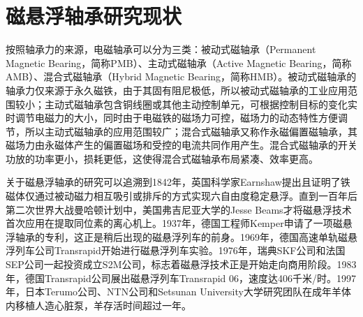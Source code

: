 \documentclass[
  lang=cn,
  degree=master,
  openany,oneside
]{nuaathesis}
\begin{document}
\section{磁悬浮轴承研究现状}

按照轴承力的来源，电磁轴承可以分为三类：被动式磁轴承（Permanent Magnetic Bearing，简称PMB）、主动式磁轴承（Active Magnetic Bearing，简称AMB）、混合式磁轴承（Hybrid Magnetic Bearing，简称HMB）。被动式磁轴承的轴承力仅来源于永久磁铁，由于其固有阻尼极低，所以被动式磁轴承的工业应用范围较小；主动式磁轴承包含铜线圈或其他主动控制单元，可根据控制目标的变化实时调节电磁力的大小，同时由于电磁铁的磁场力可控，磁场力的动态特性方便调节，所以主动式磁轴承的应用范围较广；混合式磁轴承又称作永磁偏置磁轴承，其磁场力由永磁体产生的偏置磁场和受控的电流共同作用产生。混合式磁轴承的开关功放的功率更小，损耗更低，这使得混合式磁轴承布局紧凑、效率更高。

关于磁悬浮轴承的研究可以追溯到1842年，英国科学家Earnshaw提出且证明了铁磁体仅通过被动磁力相互吸引或排斥的方式实现六自由度稳定悬浮\cite{earnshaw1842nature}。直到一百年后第二次世界大战曼哈顿计划中，美国弗吉尼亚大学的Jesse Beams才将磁悬浮技术首次应用在提取同位素的离心机上。1937年，德国工程师Kemper申请了一项磁悬浮轴承的专利\cite{kemper1937schwebebahn}，这正是稍后出现的磁悬浮列车的前身。1969年，德国高速单轨磁悬浮列车公司Transrapid开始进行磁悬浮列车实验。1976年，瑞典SKF公司和法国SEP公司一起投资成立S2M公司，标志着磁悬浮技术正是开始走向商用阶段。1983年，德国Transrapid公司展出磁悬浮列车Transrapid 06，速度达406千米/时。1997年，日本Terumo公司、NTN公司和Setsunan University大学研究团队在成年羊体内移植人造心脏泵，羊存活时间超过一年\cite{nojiri1997more}。
\end{document}
